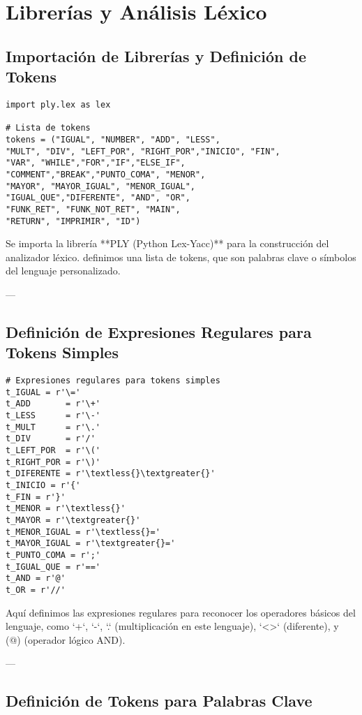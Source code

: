 \documentclass{article}
\begin{document}
\section{Librerías y Análisis Léxico}

\subsection{Importación de Librerías y Definición de Tokens}

\begin{verbatim}
import ply.lex as lex

# Lista de tokens
tokens = ("IGUAL", "NUMBER", "ADD", "LESS", 
"MULT", "DIV", "LEFT_POR", "RIGHT_POR","INICIO", "FIN", 
"VAR", "WHILE","FOR","IF","ELSE_IF", 
"COMMENT","BREAK","PUNTO_COMA", "MENOR",
"MAYOR", "MAYOR_IGUAL", "MENOR_IGUAL",
"IGUAL_QUE","DIFERENTE", "AND", "OR", 
"FUNK_RET", "FUNK_NOT_RET", "MAIN", 
"RETURN", "IMPRIMIR", "ID")
\end{verbatim}

Se importa la librería **PLY (Python Lex-Yacc)** para la construcción del analizador léxico.  definimos  una lista de tokens, que son palabras clave o símbolos del lenguaje personalizado.

---

\subsection{Definición de Expresiones Regulares para Tokens Simples}

\begin{verbatim}
# Expresiones regulares para tokens simples
t_IGUAL = r'\='
t_ADD       = r'\+'
t_LESS      = r'\-'
t_MULT      = r'\.'
t_DIV       = r'/'
t_LEFT_POR  = r'\('
t_RIGHT_POR = r'\)'
t_DIFERENTE = r'\textless{}\textgreater{}'
t_INICIO = r'{'
t_FIN = r'}'
t_MENOR = r'\textless{}'
t_MAYOR = r'\textgreater{}'
t_MENOR_IGUAL = r'\textless{}='
t_MAYOR_IGUAL = r'\textgreater{}='
t_PUNTO_COMA = r';'
t_IGUAL_QUE = r'=='
t_AND = r'@'
t_OR = r'//'
\end{verbatim}

Aquí  definimos las expresiones regulares para reconocer los operadores básicos del lenguaje, como `+`, `-`, `.` (multiplicación en este lenguaje), `\textless{}\textgreater{}` (diferente), y (@) (operador lógico AND).

---

\subsection{Definición de Tokens para Palabras Clave}
\end{document}
